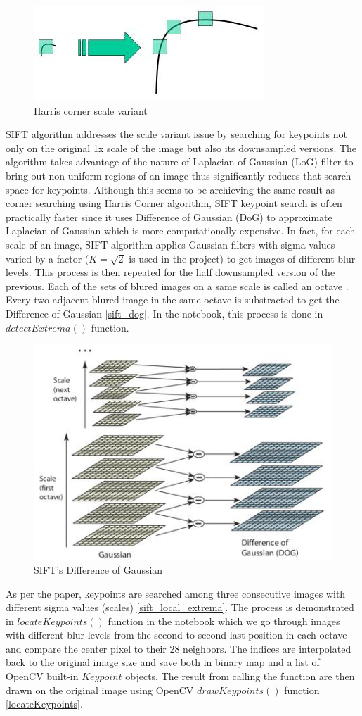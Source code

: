 \documentclass{article}
\begin{document}
\begin{multicols}{2}
	\begin{figure}
		\centering
		\includegraphics[width=0.4\linewidth]{sift_scale_invariant.jpg}
		\caption{\label{fig:sift_scale_invariant} Harris corner scale variant}
	\end{figure}
	
	SIFT algorithm addresses the scale variant issue by searching for keypoints not only on the original 1x scale of the image but also its downsampled versions. The algorithm takes advantage of the nature of Laplacian of Gaussian (LoG) filter to bring out non uniform regions of an image thus significantly reduces that search space for keypoints. Although this seems to be archieving the same result as corner searching using Harris Corner algorithm, SIFT keypoint search is often practically faster since it uses Difference of Gaussian (DoG) to approximate Laplacian of Gaussian which is more computationally expensive. In fact, for each scale of an image, SIFT algorithm applies Gaussian filters with sigma values varied by a factor ($K=\sqrt{2}$ is used in the project) to get images of different blur levels. This process is then repeated for the half downsampled version of the previous. Each of the sets of blured images on a same scale is called an octave \cite{Lowe:2004:DIF:993451.996342}. Every two adjacent blured image in the same octave is substracted to get the Difference of Gaussian \ref*{sift_dog}. In the notebook, this process is done in $detectExtrema()$ function.
	
	\begin{figure}
		\centering
		\includegraphics[width=0.4\linewidth]{sift_dog.jpg}
		\caption{\label{fig:sift_dog} SIFT's Difference of Gaussian}
	\end{figure}
	
	As per the paper, keypoints are searched among three consecutive images with different sigma values (scales) \ref{sift_local_extrema}. The process is demonstrated in $locateKeypoints()$ function in the notebook which we go through images with different blur levels from the second to second last position in each octave and compare the center pixel to their 28 neighbors. The indices are interpolated back to the original image size and save both in binary map and a list of OpenCV built-in $Keypoint$ objects. The result from calling the function are then drawn on the original image using OpenCV $drawKeypoints()$ function \ref{locateKeypoints}.
	

\end{multicols}
\end{document}
